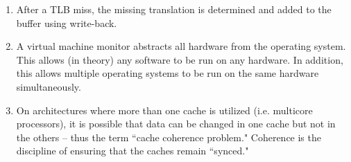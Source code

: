 \documentclass{3330hw}
\begin{document}
\begin{enumerate}
\item After a TLB miss, the missing translation is determined and added to the buffer using write-back.

\item A virtual machine monitor abstracts all hardware from the operating system. This allows (in theory) any software to be run on any hardware. In addition, this allows multiple operating systems to be run on the same hardware simultaneously.

\item On architectures where more than one cache is utilized (i.e. multicore processors), it is possible that data can be changed in one cache but not in the others  -- thus the term ``cache coherence problem." Coherence is the discipline of ensuring that the caches remain ``synced."

\end{enumerate}
	
\end{document}
